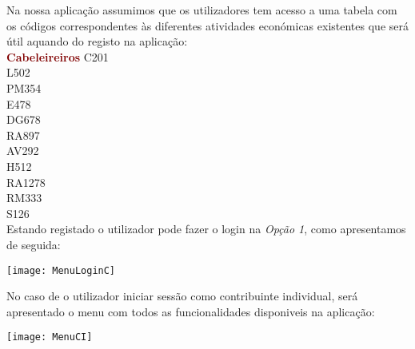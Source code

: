\documentclass[10pt,a4paper]{article}
\begin{document}
Na nossa aplicação assumimos que os utilizadores tem acesso a uma tabela com os códigos correspondentes às diferentes atividades económicas existentes que será útil aquando do registo na aplicação: \\

{\bf{\textcolor{Maroon}{Cabeleireiros}}} C201\\
\indent {\bf{\textcolor{Maroon}{Lares}}} L502\\
\indent {\bf{\textcolor{Maroon}{Passes Mensais}}} PM354\\
\indent {\bf{\textcolor{Maroon}{Educação}}} E478\\
\indent {\bf{\textcolor{Maroon}{DespesasGerais}}} DG678\\
\indent {\bf{\textcolor{Maroon}{Restauração e Alojamento}}} RA897\\
\indent {\bf{\textcolor{Maroon}{Atividades Veterinárias}}} AV292\\
\indent {\bf{\textcolor{Maroon}{Habitação}}} H512\\
\indent {\bf{\textcolor{Maroon}{Reparação Automóveis}}} RA1278\\
\indent {\bf{\textcolor{Maroon}{ReparaçãoMotociclos}}} RM333\\
\indent {\bf{\textcolor{Maroon}{Saúde}}} S126\\


Estando registado o utilizador pode fazer o login na \textit{Opção 1}, como apresentamos de seguida:

\begin{center}
\graphicspath{ {/home/jessica/Desktop/} }
\texttt{[image: MenuLoginC]}\\
\end{center}

No caso de o utilizador iniciar sessão como contribuinte individual, será apresentado o menu com todos as funcionalidades disponiveis na aplicação:

\begin{center}
\graphicspath{ {/home/jessica/Desktop/} }
\texttt{[image: MenuCI]}\\
\end{center}
\end{document}
